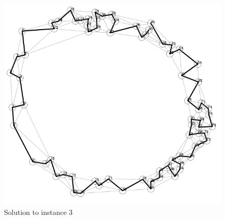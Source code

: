 \begin{figure}[H]
	\includegraphics[width=.9\textwidth]{figures/Instance3Solution.png}
	\caption{Solution to instance 3}
	\label{solution:3}
\end{figure}


\subsection{}